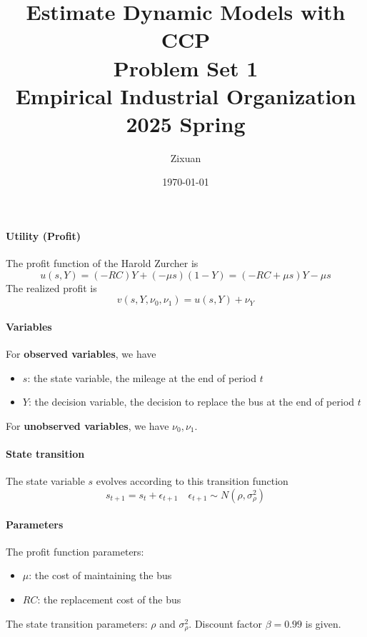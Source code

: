 \documentclass[12pt]{article}[margin=1in]
\title{\textbf{Estimate Dynamic Models with CCP} \\
    \vspace{.3cm}
    \large Problem Set 1 \\
    Empirical Industrial Organization 2025 Spring}
\author{Zixuan}
\date{\today}
\begin{document}
\maketitle

\setcounter{page}{1}

\paragraph{Utility (Profit)}
The profit function of the Harold Zurcher is
\begin{equation*}
    u(s,Y) = (-RC)Y + (-\mu s)(1 - Y) = (-RC + \mu s)Y - \mu s
\end{equation*}
The realized profit is
\begin{equation*}
    v(s,Y,\nu_0,\nu_1) = u(s,Y) + \nu_Y
\end{equation*}

\paragraph{Variables} For \textbf{observed variables}, we have
\begin{itemize}
    \item $s$: the state variable, the mileage at the end of period $t$
    \item $Y$: the decision variable, the decision to replace the bus at the end of period $t$
\end{itemize}
For \textbf{unobserved variables}, we have $\nu_0,\nu_1$.
\paragraph{State transition} The state variable $s$ evolves according to this
transition function
\begin{equation*}
    s_{t+1} = s_t + \epsilon_{t+1} \quad \epsilon_{t+1} \sim N(\rho, \sigma_{\rho}^2)
\end{equation*}
\paragraph{Parameters} The profit function parameters:
\begin{itemize}
    \item $\mu$: the cost of maintaining the bus
    \item $RC$: the replacement cost of the bus
\end{itemize}
The state transition parameters: $\rho$ and $\sigma_{\rho}^2$.
Discount factor $\beta=0.99$ is given.
\end{document}
